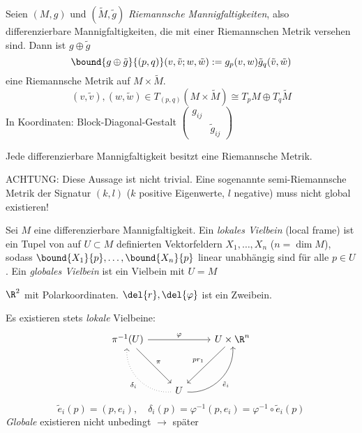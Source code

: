 \begin{defn}
	Seien $ (M,g) $ und $ (\tilde{M},\tilde{g}) $ \emph{Riemannsche Mannigfaltigkeiten}, also differenzierbare Mannigfaltigkeiten, die mit einer Riemannschen Metrik versehen sind. Dann ist $g \oplus \tilde{g}$
	\[ \bound{g \oplus \tilde{g}}{(p,q)}(v,\tilde{v};w,\tilde{w}) := g_p(v,w) \tilde{g}_q(\tilde{v},\tilde{w}) \]
	eine Riemannsche Metrik auf $M \times \tilde{M}$.
	\[ (v,\tilde{v}),(w,\tilde{w}) \in T_{(p,q)}(M \times \tilde{M}) \cong T_pM \oplus T_q\tilde{M} \]
	In Koordinaten: Block-Diagonal-Gestalt $ \begin{pmatrix}
		g_{ij} & \\ & \tilde{g}_{ij}
	\end{pmatrix} $
\end{defn}

\begin{thm}
	Jede differenzierbare Mannigfaltigkeit besitzt eine Riemannsche Metrik.
\end{thm}

\begin{rem*}
	ACHTUNG: Diese Aussage ist nicht trivial. Eine sogenannte semi-Riemannsche Metrik der Signatur $(k,l)$ ($k$ positive Eigenwerte, $l$ negative) muss nicht global existieren!
\end{rem*}

\begin{defn*}
	Sei $M$ eine differenzierbare Mannigfaltigkeit. Ein \emph{lokales Vielbein} (local frame) ist ein Tupel von auf $U \subset M$ definierten Vektorfeldern $ X_1,\dotsc,X_n $ ($n = \dim M$), sodass $ \bound{X_1}{p}, \dotsc, \bound{X_n}{p} $ linear unabhängig sind für alle $p \in U$. Ein \emph{globales Vielbein} ist ein Vielbein mit $U = M$
\end{defn*}

\begin{exmp*}
	$\R^2$ mit Polarkoordinaten. $ \del{r},\del{\varphi} $ ist ein Zweibein.
\end{exmp*}

\begin{rem}\label{6.4}
	Es existieren stets \emph{lokale} Vielbeine:
	\[ \begin{tikzcd}
		\pi^{-1}(U) \arrow{rr}{\varphi} \arrow{ddr}{\pi} & & U \times \R^n \arrow{ddl}[swap]{pr_1}\\
		&&\\
		& U \arrow[bend left = 50, dotted]{luu}{\delta_i} \arrow[bend right=50]{uur}[swap]{\tilde{e}_i} &
	\end{tikzcd} \]
	\[ \tilde{e}_i(p) = (p,e_i),\quad \delta_i(p) = \varphi^{-1} (p,e_i) = \varphi^{-1} \circ \tilde{e}_i(p) \]
	\emph{Globale} existieren nicht unbedingt $\rightarrow$ später
\end{rem}

